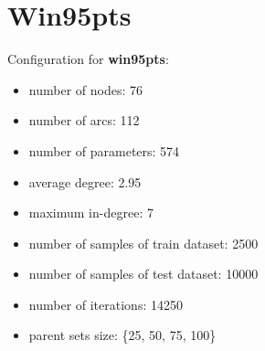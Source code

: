 \documentclass[]{scrartcl}
\begin{document}
\section{Win95pts}

Configuration for \textbf{win95pts}:

\begin{itemize}
\item number of nodes: 76
\item number of arcs: 112
\item number of parameters: 574
\item average degree: 2.95
\item maximum in-degree: 7
\item number of samples of train dataset: 2500
\item number of samples of test dataset: 10000
\item number of iterations: 14250
\item parent sets size: \{25, 50, 75, 100\}
\end{itemize}
\end{document}
